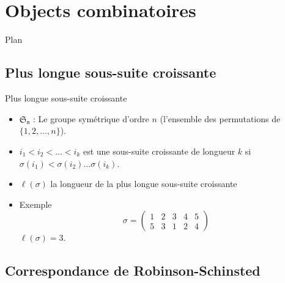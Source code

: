\documentclass[french]{beamer}
\begin{document}
\section{Objects combinatoires}
\begin{frame}{Plan}
\tableofcontents[currentsection,currentsubsection,
    hideothersubsections, 
    sectionstyle=show/shaded,
]
\end{frame}

\subsection{Plus longue sous-suite croissante}
\begin{frame}{Plus longue sous-suite croissante}
\begin{itemize}

\item $\mathfrak{S_n}$ : Le groupe symétrique d'ordre $n$ (l'ensemble des permutations de $\{1,2,\dots,n\}$).
\\ 
\item $i_1<i_2<\dots<i_k$ est une sous-suite croissante de longueur $k$ si $\sigma(i_1)<\sigma(i_2)\dots\sigma(i_k)$.

\item $\ell(\sigma)$  la longueur de la plus longue sous-suite croissante
\item Exemple \begin{equation*}\sigma=\begin{pmatrix}
 1& 2 & 3 & 4 & 5 \\ 
 5& 3 & 1 & 2 & 4 
\end{pmatrix}
\end{equation*}
$\ell(\sigma)=3$.

\end{itemize}
\end{frame}
\subsection{Correspondance de Robinson-Schinsted}
\end{document}
